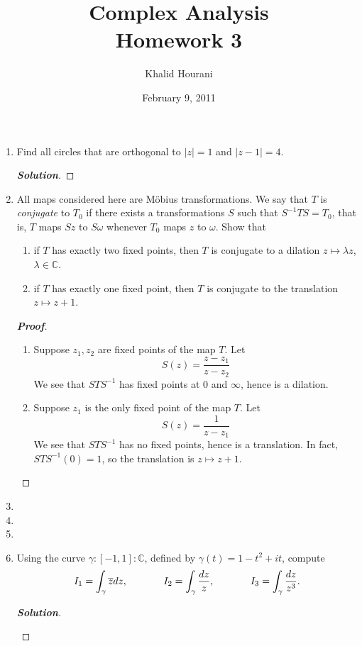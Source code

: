 \documentclass[12pt,leqno]{article}
\title{Complex Analysis\\\large Homework 3}
\date{February 9, 2011}
\author{Khalid Hourani}
\theoremstyle{definition}
\newcommand{\C}{\mathbb{C}}
\newcommand{\w}{\omega}
\newenvironment{Proof}{\begin{proof}[\textnormal{\textbf{Proof}}]}{\end{proof}}
\newenvironment{Solution}{\begin{proof}[\textnormal{\textbf{Solution}}]}{\end{proof}}
\begin{document}
 \begin{titlepage}
  \maketitle
 \end{titlepage}
\clearpage\mbox{}\clearpage

\setcounter{page}{1}
\begin{enumerate}
 \item Find all circles that are orthogonal to $|z|=1$ and $|z-1|=4$.
  \begin{Solution}
   
  \end{Solution}
 \item All maps considered here are M\"{o}bius transformations. We say that $T$ is \textit{conjugate} to $T_0$ if there exists a transformations $S$ such that $S^{-1}TS=T_0$, that is, $T$ maps $Sz$ to $S\w$ whenever $T_0$ maps $z$ to $\w$. Show that
  \begin{enumerate}
   \item if $T$ has exactly two fixed points, then $T$ is conjugate to a dilation $z\mapsto\lambda z$, $\lambda\in\C$.
   \item if $T$ has exactly one fixed point, then $T$ is conjugate to the translation $z\mapsto z+1$.
  \end{enumerate}
  \begin{Proof}\indent
  \begin{enumerate}
   \item Suppose $z_1,z_2$ are fixed points of the map $T$. Let \[S(z)=\frac{z-z_1}{z-z_2}\] We see that $STS^{-1}$ has fixed points at $0$ and $\infty$, hence is a dilation.
   \item Suppose $z_1$ is the only fixed point of the map $T$. Let \[S(z)=\frac{1}{z-z_1}\] We see that $STS^{-1}$ has no fixed points, hence is a translation. In fact, $STS^{-1}(0)=1$, so the translation is $z\mapsto z+1$.
  \end{enumerate}
  \end{Proof}
   \item 
   \item 
   \item 
   \item Using the curve $\gamma:[-1,1]:\C$, defined by $\gamma(t)=1-t^2+it$, compute \[I_1=\int_{\gamma}\overline{z}dz,\hskip.5in I_2=\int_{\gamma}\frac{dz}{z},\hskip.5in I_3=\int_{\gamma}\frac{dz}{z^3}.\]
    \begin{Solution}\indent
     \begin{itemize}

\end{itemize}
\end{Solution}
\end{enumerate}
\end{document}
